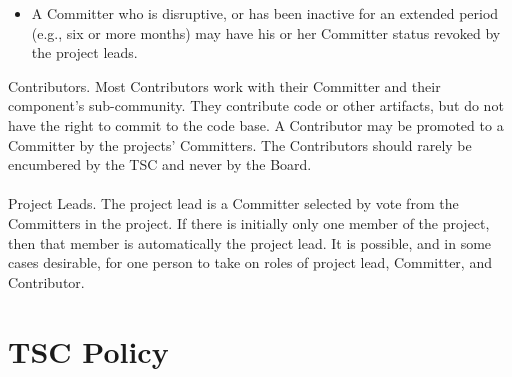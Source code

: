 \documentclass[a4paper, 12pt]{book}
\begin{document}
{\begin{itemize}
\item{A Committer who is disruptive, or has been inactive for an extended period (e.g., six or more months) may have his or her Committer status revoked by the project leads.}
\end{itemize}
Contributors.  Most Contributors work with their Committer and their component’s sub-community. They contribute code or other artifacts, but do not have the right to commit to the code base.  A Contributor may be promoted to a Committer by the projects’ Committers.  The Contributors should rarely be encumbered by the TSC and never by the Board.\\
\\
Project Leads.  The project lead is a Committer selected by vote from the Committers in the project.  If there is initially only one member of the project, then that member is automatically the project lead.  It is possible, and in some cases desirable, for one person to take on roles of project lead, Committer, and Contributor.

\chapter{TSC Policy}
\label{chap:appendix_policy}

}
\end{document}
